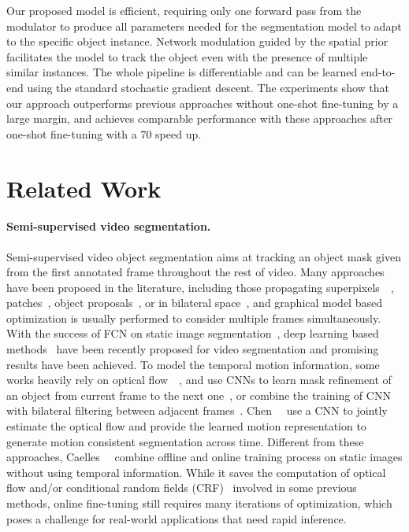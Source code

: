 \documentclass[10pt,twocolumn,letterpaper]{article}
\begin{document}
Our proposed model is efficient, requiring only one forward pass from the modulator to produce all parameters needed for the segmentation model to adapt to the specific object instance. Network modulation guided by the spatial prior facilitates the model to track the object even with the presence of multiple similar instances. The whole pipeline is differentiable and can be learned end-to-end using the standard stochastic gradient descent. The experiments show that our approach outperforms previous approaches without one-shot fine-tuning by a large margin, and achieves comparable performance with these approaches after one-shot fine-tuning with a 70 speed up. 

\section{Related Work}


\paragraph{Semi-supervised video segmentation.} Semi-supervised video object segmentation aims at tracking an object mask given from the first annotated frame throughout the rest of video. Many approaches have been proposed in the literature, including those propagating superpixels~\cite{Jain2014youtube}~\cite{Tsai2016objflow}, patches~\cite{jumpcut}, object proposals~\cite{objproposals}, or in bilateral space~\cite{Marki2016bilateral}, and graphical model based optimization is usually performed to consider multiple frames simultaneously. With the success of FCN on static image segmentation~\cite{Hariharan2015hypercolumns}, deep learning based methods~\cite{Perazzi2017masktrack, Caelles2017osvos, Shin2017pixel, Tokmakov2017memory, Jampani2017vpn, Cheng2017segflow} have been recently proposed for video segmentation and promising results have been achieved. To model the temporal motion information, some works heavily rely on optical flow~\cite{Tokmakov2017memory}~\cite{Cheng2017segflow}, and use CNNs to learn mask refinement of an object from current frame to the next one~\cite{Perazzi2017masktrack}, or combine the training of CNN with bilateral filtering between adjacent frames~\cite{Jampani2017vpn}. Chen~\etal~\cite{Cheng2017segflow} use a CNN to jointly estimate the optical flow and provide the learned motion representation to generate motion consistent segmentation across time. Different from these approaches, Caelles~\etal~\cite{Caelles2017osvos} combine offline and online training process on static images without using temporal information. While it saves the computation of optical flow and/or conditional random fields (CRF)~\cite{Krahenbuhl2011crf} involved in some previous methods, online fine-tuning still requires many iterations of optimization, which poses a challenge for real-world applications that need rapid inference.
\end{document}
